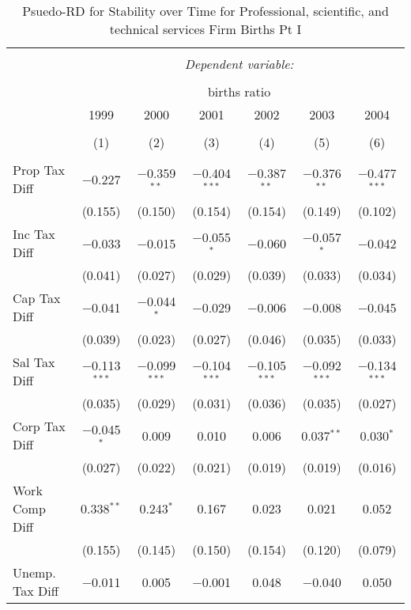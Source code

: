 
\begin{table}[!htbp] \centering 
  \caption{Psuedo-RD for Stability over Time for  Professional, scientific, and technical services Firm Births Pt I} 
  \label{54year} 
\small 
\begin{tabular}{@{\extracolsep{5pt}}lcccccc} 
\\[-1.8ex]\hline 
\hline \\[-1.8ex] 
 & \multicolumn{6}{c}{\textit{Dependent variable:}} \\ 
\cline{2-7} 
\\[-1.8ex] & \multicolumn{6}{c}{births ratio} \\ 
 & 1999 & 2000 & 2001 & 2002 & 2003 & 2004 \\ 
\\[-1.8ex] & (1) & (2) & (3) & (4) & (5) & (6)\\ 
\hline \\[-1.8ex] 
 Prop Tax Diff & $-$0.227 & $-$0.359$^{**}$ & $-$0.404$^{***}$ & $-$0.387$^{**}$ & $-$0.376$^{**}$ & $-$0.477$^{***}$ \\ 
  & (0.155) & (0.150) & (0.154) & (0.154) & (0.149) & (0.102) \\ 
  Inc Tax Diff & $-$0.033 & $-$0.015 & $-$0.055$^{*}$ & $-$0.060 & $-$0.057$^{*}$ & $-$0.042 \\ 
  & (0.041) & (0.027) & (0.029) & (0.039) & (0.033) & (0.034) \\ 
  Cap Tax Diff & $-$0.041 & $-$0.044$^{*}$ & $-$0.029 & $-$0.006 & $-$0.008 & $-$0.045 \\ 
  & (0.039) & (0.023) & (0.027) & (0.046) & (0.035) & (0.033) \\ 
  Sal Tax Diff & $-$0.113$^{***}$ & $-$0.099$^{***}$ & $-$0.104$^{***}$ & $-$0.105$^{***}$ & $-$0.092$^{***}$ & $-$0.134$^{***}$ \\ 
  & (0.035) & (0.029) & (0.031) & (0.036) & (0.035) & (0.027) \\ 
  Corp Tax Diff & $-$0.045$^{*}$ & 0.009 & 0.010 & 0.006 & 0.037$^{**}$ & 0.030$^{*}$ \\ 
  & (0.027) & (0.022) & (0.021) & (0.019) & (0.019) & (0.016) \\ 
  Work Comp Diff & 0.338$^{**}$ & 0.243$^{*}$ & 0.167 & 0.023 & 0.021 & 0.052 \\ 
  & (0.155) & (0.145) & (0.150) & (0.154) & (0.120) & (0.079) \\ 
  Unemp. Tax Diff & $-$0.011 & 0.005 & $-$0.001 & 0.048 & $-$0.040 & 0.050 \\ 

\end{tabular}
\end{table}

